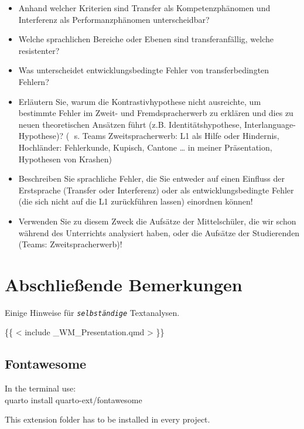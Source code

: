 \documentclass[
  letterpaper,
]{scrbook}
\begin{document}
\begin{itemize}
\item
  Anhand welcher Kriterien sind Transfer als Kompetenzphänomen und
  Interferenz als Performanzphänomen unterscheidbar?
\item
  Welche sprachlichen Bereiche oder Ebenen sind transferanfällig, welche
  resistenter?
\item
  Was unterscheidet entwicklungsbedingte Fehler von transferbedingten
  Fehlern?
\item
  Erläutern Sie, warum die Kontrastivhypothese nicht ausreichte, um
  bestimmte Fehler im Zweit- und Fremdspracherwerb zu erklären und dies
  zu neuen theoretischen Ansätzen führt (z.B. Identitätshypothese,
  Interlanguage-Hypothese)? ( s. Teams Zweitspracherwerb: L1 als Hilfe
  oder Hindernis, Hochländer: Fehlerkunde, Kupisch, Cantone \ldots{} in
  meiner Präsentation, Hypothesen von Krashen)
\item
  Beschreiben Sie sprachliche Fehler, die Sie entweder auf einen
  Einfluss der Erstsprache (Transfer oder Interferenz) oder als
  entwicklungsbedingte Fehler (die sich nicht auf die L1 zurückführen
  lassen) einordnen können!
\item
  Verwenden Sie zu diesem Zweck die Aufsätze der Mittelschüler, die wir
  schon während des Unterrichts analysiert haben, oder die Aufsätze der
  Studierenden (Teams: Zweitspracherwerb)!
\end{itemize}


\hypertarget{abschlieuxdfende-bemerkungen}{%
\chapter{Abschließende Bemerkungen}\label{abschlieuxdfende-bemerkungen}}

Einige Hinweise für \emph{\texttt{selbständige}} Textanalysen. 🤗

\{\{ \textless{} include \_WM\_Presentation.qmd \textgreater{} \}\}

\hypertarget{fontawesome}{%
\section{Fontawesome}\label{fontawesome}}

In the terminal use:\\
quarto install quarto-ext/fontawesome

This extension folder has to be installed in every project.
\end{document}
